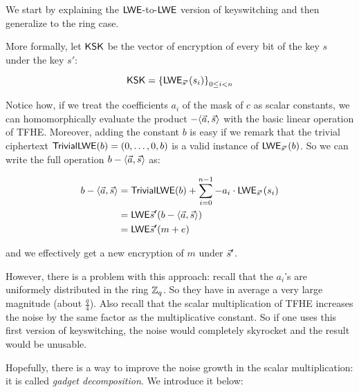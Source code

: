 We start by explaining the $\textsf{LWE}$-to-$\textsf{LWE}$ version of keyswitching and then generalize to the ring case.


More formally, let $\textsf{KSK}$ be the vector of encryption of every bit of the key $s$ under the key $s'$:

\[
	\textsf{KSK} = \left \{ \textsf{LWE}_{\vec s'}(s_i ) \right \}_{0 \le i < n}
\]

Notice how, if we treat the coefficients $a_i$ of the mask of $c$ as scalar constants, we can homomorphically evaluate the product $- \langle \vec a ,\vec s \rangle$ with the basic linear operation of TFHE. Moreover, adding the constant $b$ is easy if we remark that the trivial ciphertext $\textsf{TrivialLWE}(b) = (0, \dots, 0, b)$ is a valid instance of $\textsf{LWE}_{\vec s'}(b)$. So we can write the full operation $b - \langle \vec a, \vec s \rangle$ as:




\begin{align*}
	b - \langle \vec a, \vec s \rangle &= \textsf{TrivialLWE}(b) + \sum_{i=0}^{n-1} -a_i \cdot \textsf{LWE}_{\vec s'}(s_i)\\
	& = \textsf{LWE}{\vec s'}(b - \langle \vec a, \vec s \rangle)\\
		 &= \textsf{LWE}{\vec s'}(m + e)
\end{align*}


and we effectively get a new encryption of $m$ under $\vec s'$.


However, there is a problem with this approach: recall that the $a_i$'s are uniformely distributed in the ring $\mathbb{Z}_q$. So they have in average a very large magnitude (about $\frac q 4$). Also recall that the scalar multiplication of TFHE increases the noise by the same factor as the multiplicative constant. So if one uses this first version of keyswitching, the noise would completely skyrocket and the result would be unusable.

Hopefully, there is a way to improve the noise growth in the scalar multiplication: it is called \textit{gadget decomposition}. We introduce it below:

